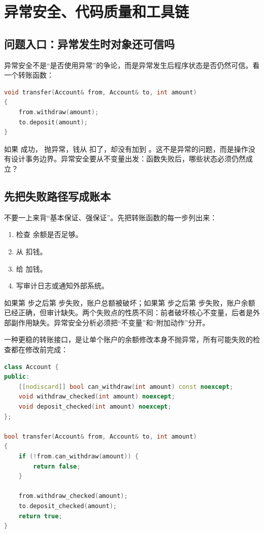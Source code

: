 \chapter{异常安全、代码质量和工具链}

\section{问题入口：异常发生时对象还可信吗}

异常安全不是“是否使用异常”的争论，而是异常发生后程序状态是否仍然可信。看一个转账函数：

\begin{lstlisting}[language=C++,caption={中途失败会破坏状态}]
void transfer(Account& from, Account& to, int amount)
{
    from.withdraw(amount);
    to.deposit(amount);
}
\end{lstlisting}

如果  成功， 抛异常，钱从  扣了，却没有加到 。这不是异常的问题，而是操作没有设计事务边界。异常安全要从不变量出发：函数失败后，哪些状态必须仍然成立？

\section{先把失败路径写成账本}

不要一上来背“基本保证、强保证”。先把转账函数的每一步列出来：

\begin{enumerate}
  \item 检查  余额是否足够。
  \item 从  扣钱。
  \item 给  加钱。
  \item 写审计日志或通知外部系统。
\end{enumerate}

如果第  步之后第  步失败，账户总额被破坏；如果第  步之后第  步失败，账户余额已经正确，但审计缺失。两个失败点的性质不同：前者破坏核心不变量，后者是外部副作用缺失。异常安全分析必须把“不变量”和“附加动作”分开。

一种更稳的转账接口，是让单个账户的余额修改本身不抛异常，所有可能失败的检查都在修改前完成：

\begin{lstlisting}[language=C++,caption={先验证再做不抛提交}]
class Account {
public:
    [[nodiscard]] bool can_withdraw(int amount) const noexcept;
    void withdraw_checked(int amount) noexcept;
    void deposit_checked(int amount) noexcept;
};

bool transfer(Account& from, Account& to, int amount)
{
    if (!from.can_withdraw(amount)) {
        return false;
    }

    from.withdraw_checked(amount);
    to.deposit_checked(amount);
    return true;
}
\end{lstlisting}

